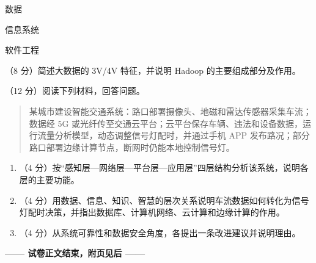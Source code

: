 \documentclass[a4paper,11pt]{article}
\begin{document}

\q 数据
\anslines{3cm}

\q 信息系统
\anslines{3cm}

\q 软件工程
\anslines{3cm}


\q （8 分）简述大数据的 3V/4V 特征，并说明 Hadoop 的主要组成部分及作用。
\anslines{5.5cm}


\q （12 分）阅读下列材料，回答问题。
\begin{quote}\small
某城市建设智能交通系统：路口部署摄像头、地磁和雷达传感器采集车流；数据经 5G 或光纤传至交通云平台；云平台保存车辆、违法和设备数据，运行流量分析模型，动态调整信号灯配时，并通过手机 APP 发布路况；部分路口部署边缘计算节点，断网时仍能本地控制信号灯。
\end{quote}
\begin{enumerate}[label=（\arabic*）, leftmargin=2.4em, itemsep=1pt]
  \item （4 分）按“感知层—网络层—平台层—应用层”四层结构分析该系统，说明各层的主要功能。
  \item （4 分）用数据、信息、知识、智慧的层次关系说明车流数据如何转化为信号灯配时决策，并指出数据库、计算机网络、云计算和边缘计算的作用。
  \item （4 分）从系统可靠性和数据安全角度，各提出一条改进建议并说明理由。
\end{enumerate}
\anslines{12cm}

\vfill
\begin{center}
\textbf{—— 试卷正文结束，附页见后 ——}
\end{center}

\end{document}
